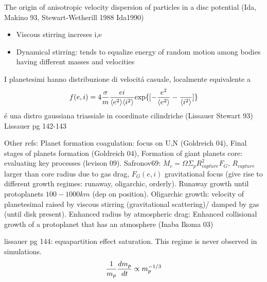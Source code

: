 \begin{workout}
The origin of anisotropic velocity dispersion of particles in a disc potential (Ida, Makino 93, Stewart-Wetherill 1988 Ida1990)
\end{workout}

\begin{workout}
\begin{itemize}
\item Viscous stirring increses i,e
\item Dynamical stirring: tends to equalize energy of random motion among bodies having different masses and velocities
\end{itemize}
\end{workout}

\begin{workout}
I planetesimi hanno distribuzione di velocit\'a casuale, localmente equivalente a
\begin{equation}
f(e,i)=4\frac{\sigma}{m}\frac{ei}{\exv{e^2}\exv{i^2}}\Exp{[-\frac{e^2}{\exv{e^2}}-\frac{}{\exv{i^2}}]}
\end{equation}
\'e una distro gaussiana triassiale in coordinate cilindriche (Lissauer Stewart 93)
Lissauer pg 142-143
\end{workout}

\begin{workout}
Other refs: Planet formation coagulation: focus on U,N (Goldreich 04), Final stages of planets formation (Goldreich 04), Formation of giant planets core: evaluating key processes (levison 09).
Safronov69: $\dot{M}_c=\Omega\Sigma_pR^2_{capture}F_G$, $R_{capture}$ larger than core radius due to gas drag, $F_G(e,i)$ gravitational focus (give rise to different growth regimes: runaway, oligarchic, orderly).
Runaway growth until protoplanets $100-1000km$ (dep on position).
Oligarchic growth: velocity of planetesimal raised by viscous stirring (gravitational scattering)/ damped by gas (until disk present).
Enhanced radius by atmospheric drag: Enhanced collisional growth of a protoplanet that has an atmosphere (Inaba Ikoma 03)
\end{workout}

\begin{workout}
lissauer pg 144: equapartition effect saturation. This regime is never observed in simulations.
\begin{equation}
\frac{1}{m_p}\TDy{t}{m_p}\propto m_p\expy{-1/3}
\end{equation}
\end{workout}

